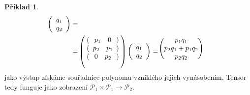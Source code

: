 \documentclass[a5paper,12pt]{amsbook}
\theoremstyle{definition}
\newtheorem{example}{Příklad}[chapter]
\begin{document}
\begin{example}
\begin{equation*}
\begin{split}
\left(\begin{array}{c}q_1 \\ q_2\end{array}\right)= \\ = &
\left(\begin{blockarray}{c}
\begin{block}{(c)}
\begin{array}{cc}p_1 & 0\end{array} \\
\end{block}
\begin{block}{(c)}
\begin{array}{cc}p_2 & p_1\end{array} \\
\end{block}
\begin{block}{(c)}
\begin{array}{cc}0 & p_2\end{array} \\
\end{block}
\end{blockarray}\right)
\left(\begin{array}{c}q_1 \\ q_2\end{array}\right)= 
\begin{blockarray}{(c)}
p_1q_1 \\
p_2q_1 + p_1q_2 \\
p_2q_2 \\
\end{blockarray}
\end{split}
\end{equation*}
jako výstup získáme souřadnice polynomu vzniklého jejich vynásobením. Tensor tedy funguje
jako zobrazení $\mathcal{P}_1\times\mathcal{P}_1\rightarrow\mathcal{P}_2$.


\end{example}
\end{document}
